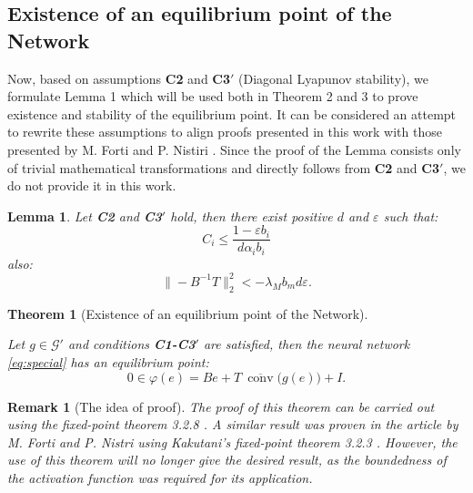 \documentclass[journal]{IEEEtran}
\newtheorem{theorem}{Theorem}
\newtheorem{lemma}{Lemma}
\newtheorem{remark}{Remark}
\begin{document}
\subsection*{Existence of an equilibrium point of the Network}
Now, based on assumptions \textbf{C2} and \textbf{C3$'$} (Diagonal Lyapunov stability), we formulate Lemma 1 which will be used both in Theorem 2 and 3 to prove existence and stability of the equilibrium point. It can be considered an attempt to rewrite these assumptions to align proofs presented in this work with those presented by M. Forti and P. Nistiri \cite{p1}. Since the proof of the Lemma consists only of trivial mathematical transformations and directly follows from \textbf{C2} and \textbf{C3$'$}, we do not provide it in this work.  \\
\begin{lemma}\label{main_lemma}
    \textnormal{Let \textbf{C2} and \textbf{C3$'$} hold, then there exist positive $d$ and $\varepsilon$ such that:}
    \begin{equation*}\label{2.3.2}
        C_i \leqslant \frac {1 -\varepsilon b_i}{d\alpha_i b_i}
    \end{equation*}
    \textnormal{also:}
    \begin{equation}\label{2.3.3}   
     \|-B^{-1} T\|^2_2 < {-\lambda_M b_m}d  \varepsilon.  
    \end{equation}
   
    
\end{lemma}

\begin{theorem}[Existence of an equilibrium point of the Network]\label{exists}

Let $g\in \mathcal{G'}$ and conditions \textbf{C1-C3$'$} are satisfied, then the neural network \eqref{eq:special} has an equilibrium point:
\begin{equation*}
	0\in\varphi(e)=Be+T ~ \overline{\operatorname{conv}}\big(g(e)\big)+I.
\end{equation*}

\end{theorem}

\begin{remark} [The idea of proof]
The proof of this theorem can be carried out using the fixed-point theorem 3.2.8 \cite[p. 90]{p3}. A similar result was proven in the article by M. Forti and P. Nistri \cite{p1} using Kakutani's fixed-point theorem 3.2.3 \cite[p. 87]{p3}. However, the use of this theorem will no longer give the desired result, as the boundedness of the activation function was required for its application.
\end{remark}
\end{document}
